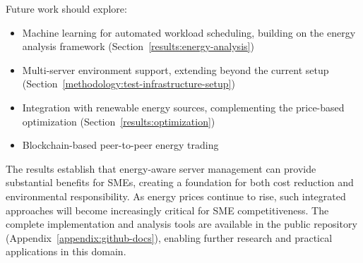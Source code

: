 Future work should explore:
\begin{itemize}
    \item Machine learning for automated workload scheduling, building on the energy analysis framework (Section~\ref{results:energy-analysis})
    \item Multi-server environment support, extending beyond the current setup (Section~\ref{methodology:test-infrastructure-setup})
    \item Integration with renewable energy sources, complementing the price-based optimization (Section~\ref{results:optimization})
    \item Blockchain-based peer-to-peer energy trading
\end{itemize}

The results establish that energy-aware server management can provide substantial benefits for SMEs, creating a foundation for both cost reduction and environmental responsibility. As energy prices continue to rise, such integrated approaches will become increasingly critical for SME competitiveness. The complete implementation and analysis tools are available in the public repository (Appendix~\ref{appendix:github-docs}), enabling further research and practical applications in this domain.